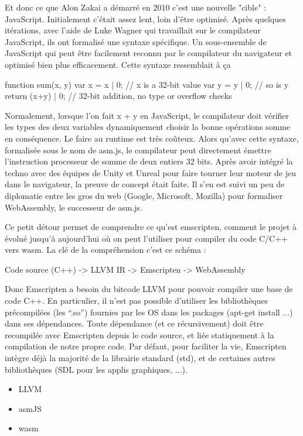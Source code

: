 Et donc ce que Alon Zakai a démarré en 2010 c’est une nouvelle "cible" : JavaScript. Initialement c’était assez lent, loin d’être optimisé. Après quelques itérations, avec l’aide de Luke Wagner qui travaillait sur le compilateur JavaScript, ils ont formalisé une syntaxe spécifique. Un sous-ensemble de JavaScript qui peut être facilement reconnu par le compilateur du navigateur et optimisé bien plus efficacement. Cette syntaxe ressemblait à ça

function sum(x, y) {
    var x = x | 0;  // x is a 32-bit value
    var y = y | 0;  // so is y
    return (x+y) | 0; // 32-bit addition, no type or overflow checks
}

Normalement, lorsque l’on fait x + y en JavaScript, le compilateur doit vérifier les types des deux variables dynamiquement choisir la bonne opérations somme en conséquence. Le faire au runtime est très coûteux. Alors qu’avec cette syntaxe, formalisée sous le nom de asm.js, le compilateur peut directement émettre l’instruction processeur de somme de deux entiers 32 bits. Après avoir intégré la techno avec des équipes de Unity et Unreal pour faire tourner leur moteur de jeu dans le navigateur, la preuve de concept était faite. Il s’en est suivi un peu de diplomatie entre les gros du web (Google, Microsoft, Mozilla) pour formaliser WebAssembly, le successeur de asm.js.

Ce petit détour permet de comprendre ce qu’est emscripten, comment le projet à évolué jusqu’à aujourd’hui où on peut l’utiliser pour compiler du code C/C++ vers wasm. La clé de la compréhension c’est ce schéma :

Code source (C++) -> LLVM IR -> Emscripten -> WebAssembly

Donc Emscripten a besoin du bitcode LLVM pour pouvoir compiler une base de code C++. En particulier, il n’est pas possible d’utiliser les bibliothèques précompilées (les “.so”) fournies par les OS dans les packages (apt-get install ...) dans ses dépendances. Toute dépendance (et ce récursivement) doit être recompilée avec Emscripten depuis le code source, et liée statiquement à la compilation de notre propre code. Par défaut, pour faciliter la vie, Emscripten intègre déjà la majorité de la librairie standard (std), et de certaines autres bibliothèques (SDL pour les applis graphiques, ...).


\begin{itemize}
	\item LLVM
	\item asmJS
	\item wasm
\end{itemize}

